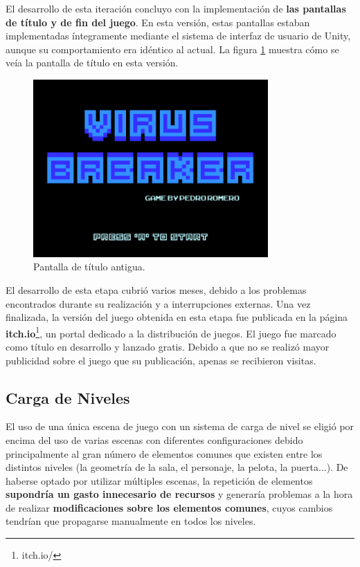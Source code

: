 El desarrollo de esta iteración concluyo con la implementación de \textbf{las pantallas de título y de fin del juego}. En esta versión, estas pantallas estaban implementadas íntegramente mediante el sistema de interfaz de usuario de Unity, aunque su comportamiento era idéntico al actual. La figura \ref{titilo_origen} muestra cómo se veía la pantalla de título en esta versión.
\begin{figure}[h]
    \centering
    \includegraphics[width=0.8\textwidth]{images/resultados/desarrollo/titulo_origen}
    \caption{Pantalla de título antigua.}
    \label{titilo_origen}
\end{figure}

El desarrollo de esta etapa cubrió varios meses, debido a los problemas encontrados durante su realización y a interrupciones externas. Una vez finalizada, la versión del juego obtenida en esta etapa fue publicada en la página \textbf{itch.io}\footnote{itch.io/}, un portal dedicado a la distribución de juegos. El juego fue marcado como título en desarrollo y lanzado gratis. Debido a que no se realizó mayor publicidad sobre el juego que su publicación, apenas se recibieron visitas.

\subsection{Carga de Niveles}
El uso de una única escena de juego con un sistema de carga de nivel se eligió por encima del uso de varias escenas con diferentes configuraciones debido principalmente al gran número de elementos comunes que existen entre los distintos niveles (la geometría de la sala, el personaje, la pelota, la puerta...). De haberse optado por utilizar múltiples escenas, la repetición de elementos \textbf{supondría un gasto innecesario de recursos} y generaría problemas a la hora de realizar \textbf{modificaciones sobre los elementos comunes}, cuyos cambios tendrían que propagarse manualmente en todos los niveles.

